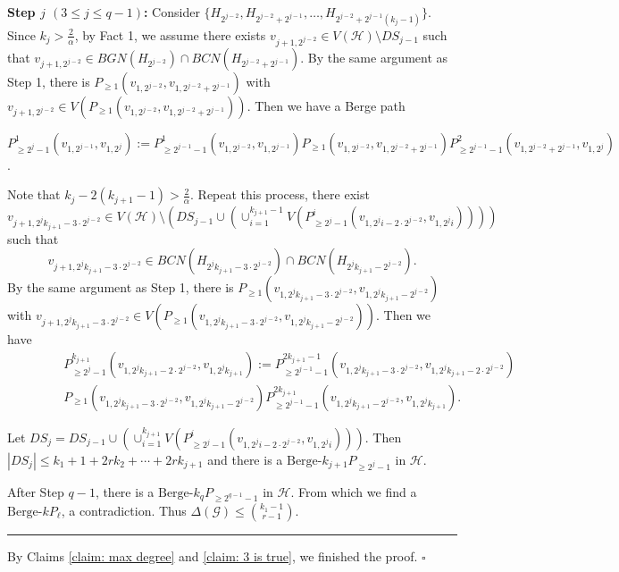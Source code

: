 \documentclass[12pt]{article}%
\def\q{\hfill\rule{1ex}{1ex}}
\def\q{\hfill\rule{1ex}{1ex}}
\newenvironment{proof}{{\noindent\it Proof.}}{\hfill $\square$\par}
\newcommand{\ber}{\text{Berge-}}
\newcommand{\mh}{\mathcal{H}}
\newcommand{\mg}{\mathcal{G}}
\begin{document}
\begin{proof}
     \par\noindent
     {\bf Step $j$ $(3\le j\le q-1)$:}  Consider $\{H_{2^{j-2}},H_{2^{j-2}+2^{j-1}},\ldots,H_{2^{j-2}+2^{j-1}(k_j-1)}\}$. Since $k_j>\frac{2}{\alpha}$, by Fact 1, we assume there exists $v_{j+1,2^{j-2}}\in V(\mh)\setminus DS_{j-1}$ such that $v_{j+1,2^{j-2}}\in BGN(H_{2^{j-2}})\cap BCN(H_{2^{j-2}+2^{j-1}})$.
     By the same argument as Step 1, there is $P_{\ge 1}(v_{1,2^{j-2}},v_{1,2^{j-2}+2^{j-1}})$ with $v_{j+1,2^{j-2}}\in V(P_{\ge 1}(v_{1,2^{j-2}},v_{1,2^{j-2}+2^{j-1}}))$. Then we have a Berge path
     \par\noindent
     $P_{\ge 2^j-1}^{1}(v_{1,2^{j-1}},v_{1,2^j}):=P_{\ge 2^{j-1}-1}^{1}(v_{1,2^{j-2}},v_{1,2^{j-1}})P_{\ge 1}(v_{1,2^{j-2}},v_{1,2^{j-2}+2^{j-1}})P_{\ge 2^{j-1}-1}^{2}(v_{1,2^{j-2}+2^{j-1}},v_{1,2^j})$.
     \par
     Note that $k_j-2(k_{j+1}-1)>\frac{2}{\alpha}$.
     Repeat this process,  there exist $v_{j+1,2^jk_{j+1}-3\cdot 2^{j-2}}\in V(\mh)\setminus \left(DS_{j-1}\cup \left(\cup_{i=1}^{k_{j+1}-1}V(P_{\ge 2^j-1}^{i}(v_{1,2^{j}i-2\cdot2^{j-2}},v_{1,2^{j}i}))\right)\right)$ such that $$v_{j+1,2^jk_{j+1}-3\cdot 2^{j-2}}\in BCN(H_{2^{j}k_{j+1}-3\cdot2^{j-2}})\cap BCN(H_{2^{j}k_{j+1}-2^{j-2}}).$$ By the same argument as Step 1, there is $P_{\ge1}(v_{1,2^{j}k_{j+1}-3\cdot2^{j-2}},v_{1,2^{j}k_{j+1}-2^{j-2}})$ with $v_{j+1,2^jk_{j+1}-3\cdot 2^{j-2}}\in V(P_{\ge1}(v_{1,2^{j}k_{j+1}-3\cdot2^{j-2}},v_{1,2^{j}k_{j+1}-2^{j-2}}))$. Then we have
    \begin{equation*}
    \begin{aligned}
     &P_{\ge 2^j-1}^{k_{j+1}}(v_{1,2^{j}k_{j+1}-2\cdot2^{j-2}},v_{1,2^{j}k_{j+1}})
     :=P_{\ge 2^{j-1}-1}^{2k_{j+1}-1}(v_{1,2^{j}k_{j+1}-3\cdot2^{j-2}},v_{1,2^{j}k_{j+1}-2\cdot2^{j-2}})\\
     ~~~~~~~~~~~~~~~&P_{\ge1}(v_{1,2^{j}k_{j+1}-3\cdot2^{j-2}},v_{1,2^{j}k_{j+1}-2^{j-2}})
     P_{\ge2^{j-1}-1}^{2k_{j+1}}(v_{1,2^{j}k_{j+1}-2^{j-2}},v_{1,2^{j}k_{j+1}}).
    \end{aligned}
\end{equation*}

     \par
     Let $DS_{j}=DS_{j-1}\cup \left(\cup_{i=1}^{k_{j+1}}V(P_{\ge 2^j-1}^{i}(v_{1,2^{j}i-2\cdot2^{j-2}},v_{1,2^{j}i}))\right)$. Then $|DS_j|\le k_1+1+2rk_2+\cdots+2rk_{j+1}$ and there is a $\ber k_{j+1}P_{\ge 2^{j}-1}$ in $\mh$.

\par

     After Step $q-1$, there is a $\ber k_{q}P_{\ge2^{q-1}-1}$ in $\mh$. From which we find a $\ber kP_{\ell}$, a contradiction. Thus $\Delta(\mg)\leq \binom{k_1-1}{r-1}$.
    \q

 By Claims \ref{claim: max degree} and \ref{claim: 3 is true}, we finished the proof.
\end{proof}
\end{document}
